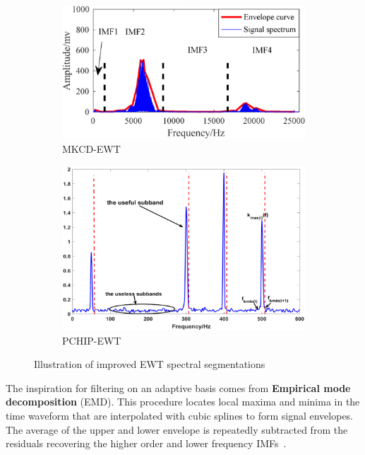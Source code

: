 \begin{figure}[ht]
    \centering
    \begin{subfigure}[b]{0.49\textwidth}
        \includegraphics[width=\textwidth]{assets/analysis/MKCD-EWT.png}
        \caption{MKCD-EWT~\cite{li_fault_2019}}
        \label{fig:mkcd-ewt-segmentation}
    \end{subfigure}
    \hfill
    \begin{subfigure}[b]{0.49\textwidth}
        \includegraphics[width=\textwidth]{assets/analysis/PCHIP-EWT.png}
        \caption{PCHIP-EWT~\cite{zhuang_improved_2020}}
        \label{fig:pchip-ewt-segmentation}
    \end{subfigure}
    \caption{Illustration of improved EWT spectral segmentations}
\end{figure}

The inspiration for filtering on an adaptive basis comes from \textbf{Empirical mode decomposition} (EMD). This procedure locates local maxima and minima in the time waveform that are interpolated with cubic splines to form signal envelopes. The average of the upper and lower envelope is repeatedly subtracted from the residuals recovering the higher order and lower frequency IMFs~\cite{wang_computational_2014}. 

